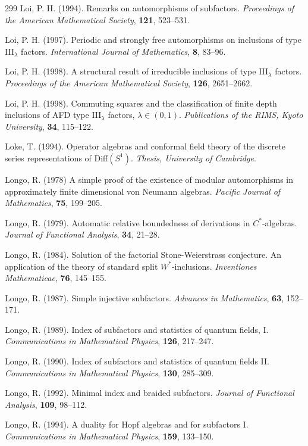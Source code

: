 \documentclass[12pt]{article}
\theoremstyle{plain}
\theoremstyle{definition}
\numberwithin{equation}{section}
\begin{document}
\begin{thebibliography} {299}
Loi, P. H. (1994).
Remarks on automorphisms of subfactors.
{\em Proceedings of the American Mathematical Society},
{\bf 121}, 523--531.

Loi, P. H. (1997).
Periodic and strongly free automorphisms on inclusions of
type III$_\lambda$ factors.
{\em International Journal of Mathematics},
{\bf 8}, 83--96.

Loi, P. H. (1998).
A structural result of irreducible inclusions of type
III$_\lambda$ factors.
{\em Proceedings of the American Mathematical Society},
{\bf 126}, 2651--2662.

Loi, P. H. (1998).
Commuting squares and the classification of finite depth
inclusions of AFD type III$_\lambda$ factors, $\lambda\in(0,1)$.
{\em Publications of the RIMS, Kyoto University},
{\bf 34}, 115--122.

Loke, T. (1994).
Operator algebras and conformal field theory of the
discrete series representations of Diff$(S^1)$.
{\em Thesis, University of Cambridge}.

Longo, R. (1978)
A simple proof of the existence of modular
automorphisms in approximately finite dimensional
von Neumann algebras.
{\em Pacific Journal of Mathematics}, {\bf 75}, 199--205.

Longo, R. (1979).
Automatic relative boundedness of derivations in
$C^*$-algebras.
{\em Journal of Functional Analysis},
{\bf 34}, 21--28.

Longo, R. (1984).
Solution of the factorial Stone-Weierstrass conjecture.
An application of the theory of standard split $W^*$-inclusions.
{\em Inventiones Mathematicae}, {\bf 76}, 145--155.

Longo, R. (1987).
Simple injective subfactors.
{\em Advances in Mathematics}, {\bf 63}, 152--171.

Longo, R. (1989).
Index of subfactors and statistics of quantum fields, I.
{\em Communications in Mathematical Physics}, {\bf 126}, 217--247.

Longo, R. (1990).
Index of subfactors and statistics of quantum fields II.
{\em Communications in Mathematical Physics}, {\bf 130}, 285--309.

Longo, R. (1992).
Minimal index and braided subfactors.
{\em Journal of Functional Analysis}, {\bf 109}, 98--112.

Longo, R. (1994).
A duality for Hopf algebras and for subfactors I.
{\em Communications in Mathematical Physics},
{\bf 159}, 133--150.


\end{thebibliography}
\end{document}
